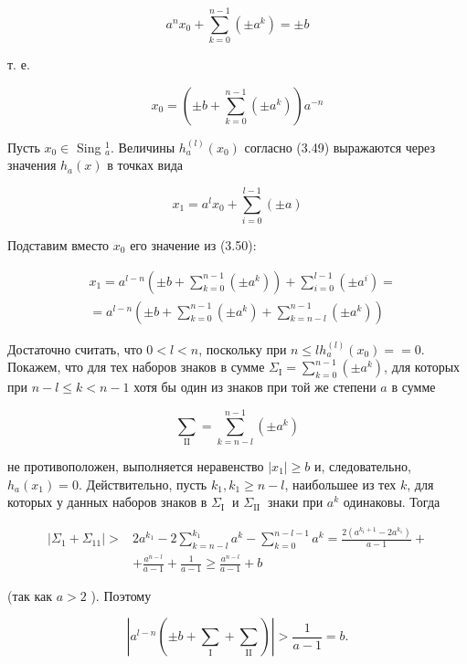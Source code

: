 \documentclass[10pt]{article}
\begin{document}
$$
a^{n} x_{0}+\sum_{k=0}^{n-1}\left( \pm a^{k}\right)= \pm b
$$

т. е.


\begin{equation*}
x_{0}=\left( \pm b+\sum_{k=0}^{n-1}\left( \pm a^{k}\right)\right) a^{-n} \tag{3.50}
\end{equation*}


Пусть $x_{0} \in$ Sing $_{a}^{1}$. Величины $h_{a}^{(l)}\left(x_{0}\right)$ согласно (3.49) выражаются через значения $h_{a}(x)$ в точках вида

$$
x_{1}=a^{l} x_{0}+\sum_{i=0}^{l-1}( \pm a)
$$

Подставим вместо $x_{0}$ его значение из (3.50):

$$
\begin{aligned}
& x_{1}=a^{l-n}\left( \pm b+\sum_{k=0}^{n-1}\left( \pm a^{k}\right)\right)+\sum_{i=0}^{l-1}\left( \pm a^{i}\right)= \\
& =a^{l-n}\left( \pm b+\sum_{k=0}^{n-1}\left( \pm a^{k}\right)+\sum_{k=n-l}^{n-1}\left( \pm a^{k}\right)\right)
\end{aligned}
$$

Достаточно считать, что $0<l<n$, поскольку при $n \leqslant l h_{a}^{(l)}\left(x_{0}\right)= =0$. Покажем, что для тех наборов знаков в сумме $\Sigma_{\mathrm{I}}=\sum_{k=0}^{n-1}\left( \pm a^{k}\right)$, для которых при $n-l \leqslant k<n-1$ хотя бы один из знаков при той же степени $a$ в сумме

$$
\sum_{\mathrm{II}}=\sum_{k=n-l}^{n-1}\left( \pm a^{k}\right)
$$

не противоположен, выполняется неравенство $\left|x_{1}\right| \geqslant b$ и, следовательно, $h_{a}\left(x_{1}\right)=0$. Действительно, пусть $k_{1}, k_{1} \geqslant n-l$, наибольшее из тех $k$, для которых у данных наборов знаков в $\Sigma_{\text {I }}$ и $\Sigma_{\text {II }}$ знаки при $a^{k}$ одинаковы. Тогда

$$
\begin{aligned}
\left|\Sigma_{1}+\Sigma_{11}\right|> & 2 a^{k_{1}}-2 \sum_{k=n-l}^{k_{1}} a^{k}-\sum_{k=0}^{n-l-1} a^{k}=\frac{2\left(a^{k_{1}+1}-2 a^{k_{1}}\right)}{a-1}+ \\
& +\frac{a^{n-l}}{a-1}+\frac{1}{a-1} \geqslant \frac{a^{n-l}}{a-1}+b
\end{aligned}
$$

(так как $a>2$ ). Поэтому

$$
\left|a^{l-n}\left( \pm b+\sum_{\mathrm{I}}+\sum_{\mathrm{II}}\right)\right|>\frac{1}{a-1}=b .
$$
\end{document}
